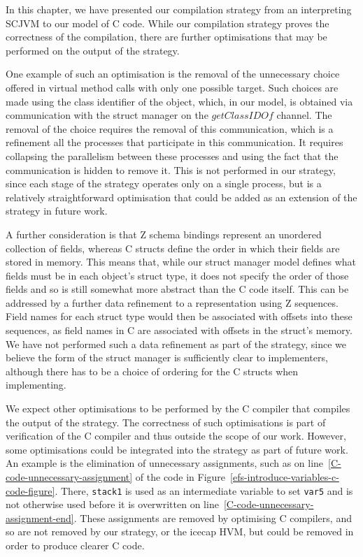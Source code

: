 In this chapter, we have presented our compilation strategy from an
interpreting SCJVM to our model of C code. While our compilation
strategy proves the correctness of the compilation, there are further
optimisations that may be performed on the output of the strategy.

One example of such an optimisation is the removal of the unnecessary
choice offered in virtual method calls with only one possible target.
Such choices are made using the class identifier of the object, which,
in our model, is obtained via communication with the struct manager on
the $getClassIDOf$ channel. 
The removal of the choice requires the removal of this communication,
which is a refinement all the processes that participate in this
communication. 
It requires collapsing the parallelism between these processes and
using the fact that the communication is hidden to remove it. 
This is not performed in our strategy, since each stage of the
strategy operates only on a single process, but is a relatively
straightforward optimisation that could be added as an extension of
the strategy in future work.

A further consideration is that Z schema bindings represent an
unordered collection of fields, whereas C structs define the order in
which their fields are stored in memory.
This means that, while our struct manager model defines what fields
must be in each object's struct type, it does not specify the order of
those fields and so is still somewhat more abstract than the C code
itself.
This can be addressed by a further data refinement to a representation
using Z sequences.
Field names for each struct type would then be associated with offsets
into these sequences, as field names in C are associated with offsets
in the struct's memory.
We have not performed such a data refinement as part of the strategy,
since we believe the form of the struct manager is sufficiently clear
to implementers, although there has to be a choice of ordering for the
C structs when implementing.

We expect other optimisations to be performed by the C compiler that
compiles the output of the strategy.
The correctness of such optimisations is part of verification of the C
compiler and thus outside the scope of our work.
However, some optimisations could be integrated into the strategy as
part of future work.
An example is the elimination of unnecessary assignments, such as on
line~\ref{C-code-unnecessary-assignment} of the code in
Figure~\ref{efs-introduce-variables-c-code-figure}.
There, \texttt{stack1} is used as an intermediate variable to set
\texttt{var5} and is not otherwise used before it is overwritten on
line~\ref{C-code-unnecessary-assignment-end}.
These assignments are removed by optimising C compilers, and so are
not removed by our strategy, or the icecap HVM, but could be removed
in order to produce clearer C code.

